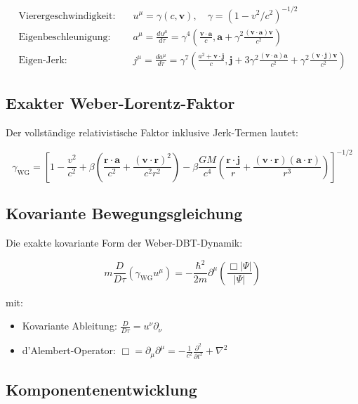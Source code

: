\begin{align}
\text{Vierergeschwindigkeit:} &\quad u^\mu = \gamma(c, \mathbf{v}), \quad \gamma = (1-v^2/c^2)^{-1/2} \\
\text{Eigenbeschleunigung:} &\quad a^\mu = \frac{du^\mu}{d\tau} = \gamma^4\left(\frac{\mathbf{v}\cdot\mathbf{a}}{c}, \mathbf{a} + \gamma^2\frac{(\mathbf{v}\cdot\mathbf{a})\mathbf{v}}{c^2}\right) \\
\text{Eigen-Jerk:} &\quad j^\mu = \frac{da^\mu}{d\tau} = \gamma^7\left(\frac{a^2 + \mathbf{v}\cdot\mathbf{j}}{c}, \mathbf{j} + 3\gamma^2\frac{(\mathbf{v}\cdot\mathbf{a})\mathbf{a}}{c^2} + \gamma^2\frac{(\mathbf{v}\cdot\mathbf{j})\mathbf{v}}{c^2}\right)
\end{align}

\subsection{Exakter Weber-Lorentz-Faktor}
Der vollständige relativistische Faktor inklusive Jerk-Termen lautet:

\begin{equation}
\gamma_{\mathrm{WG}} = \left[1 - \frac{v^2}{c^2} + \beta\left(\frac{\mathbf{r}\cdot\mathbf{a}}{c^2} + \frac{(\mathbf{v}\cdot\mathbf{r})^2}{c^2r^2}\right) - \beta\frac{GM}{c^4}\left(\frac{\mathbf{r}\cdot\mathbf{j}}{r} + \frac{(\mathbf{v}\cdot\mathbf{r})(\mathbf{a}\cdot\mathbf{r})}{r^3}\right)\right]^{-1/2}
\end{equation}

\subsection{Kovariante Bewegungsgleichung}
Die exakte kovariante Form der Weber-DBT-Dynamik:

\begin{equation}
\boxed{
m\frac{D}{D\tau}\left(\gamma_{\mathrm{WG}} u^\mu\right) = -\frac{\hbar^2}{2m}\partial^\mu\left(\frac{\Box|\Psi|}{|\Psi|}\right)
}
\end{equation}

mit:
\begin{itemize}
\item Kovariante Ableitung: $\frac{D}{D\tau} = u^\nu\partial_\nu$
\item d'Alembert-Operator: $\Box = \partial_\mu\partial^\mu = -\frac{1}{c^2}\frac{\partial^2}{\partial t^2} + \nabla^2$
\end{itemize}

\subsection{Komponentenentwicklung}

